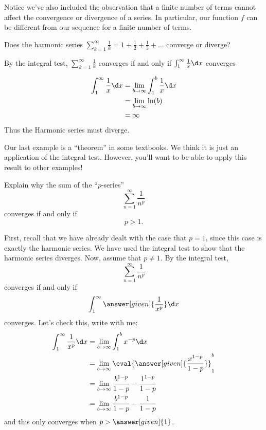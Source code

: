 \documentclass{ximera}
\begin{document}
Notice we've also included the observation that a finite number of terms 
cannot affect the convergence or divergence of a series.  In particular, 
our function $f$ can be different from our sequence for a 
finite number of terms.  

\begin{question}
  Does the harmonic series $\sum_{k=1}^\infty \frac{1}{k} = 1 + \frac{1}{2} + \frac{1}{3}+ \dots$ converge or diverge?
  \begin{multipleChoice}
  \end{multipleChoice}
  \begin{hint}
    By the integral test, $\sum_{k=1}^\infty \frac{1}{k}$ converges if
    and only if $\int_1^\infty \frac{1}{x} \d x$ converges
  \end{hint}
  \begin{hint}
    \begin{align*}
      \int_1^\infty \frac{1}{x} \d x &= \lim_{b \to \infty} \int_1^b \frac{1}{x} \d x\\
      &=\lim_{b \to \infty} \ln(b) \\
      &=\infty
    \end{align*}
    Thus the Harmonic series must diverge.
  \end{hint}
\end{question}

Our last example is a ``theorem'' in some textbooks. We think it is
just an application of the integral test.  However, you'll want to be able 
to apply this result to other examples!

\begin{example}[$p$-test]
  Explain why the sum of the ``$p$-series''
  \[
  \sum_{n=1}^\infty \frac{1}{n^p}
  \]
  converges if and only if
  \[
  p > 1.
  \]
  \begin{explanation}
    First, recall that we have already dealt with the case that $p = 1$, since 
    this case is exactly the harmonic series.  We have used the integral test 
    to show that the harmonic series diverges.
    Now, assume that $p \ne 1$.  By the integral test,
    \[
    \sum_{n=1}^\infty \frac{1}{n^p}
    \]
    converges if and only if
    \[
    \int_1^\infty \answer[given]{\frac{1}{x^p}} \d x
    \]
    converges. Let's check this, write with me:
    \begin{align*}
      \int_1^\infty \frac{1}{x^p} \d x &= \lim_{b\to\infty} \int_1^b x^{-p} \d x\\
      &= \lim_{b\to\infty} \eval{\answer[given]{\frac{x^{1-p}}{1-p}}}_1^b\\
      &= \lim_{b\to\infty} \frac{b^{1-p}}{1-p} - \frac{1^{1-p}}{1-p}\\
      &= \lim_{b\to\infty} \frac{b^{1-p}}{1-p} - \frac{1}{1-p}
    \end{align*}
    and this only converges when $p>\answer[given]{1}$.
  \end{explanation}
\end{example}
\end{document}
